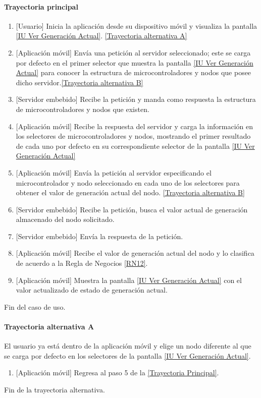\paragraph{Trayectoria principal}
    \label{SUB-U-CU1.1:TP}
	\begin{enumerate}
	    \item {[Usuario]} Inicia la aplicación desde su dispositivo móvil y visualiza la pantalla \hyperref[fig:monitoreoReal]{[IU Ver Generación Actual]}. \hyperref[SUB-U-CU1.1:TA]{[Trayectoria alternativa A]}
	    \item {[Aplicación móvil]} Envía una petición al servidor seleccionado; este se carga por defecto en el primer selector que muestra la pantalla \hyperref[fig:monitoreoReal]{[IU Ver Generación Actual]} para conocer la estructura de microcontroladores y nodos que posee dicho servidor.\hyperref[SUB-U-CU1.1:TB]{[Trayectoria alternativa B]}
	    \item {[Servidor embebido]} Recibe la petición y manda como respuesta la estructura de microcontroladores y nodos que existen.
	    \item {[Aplicación móvil]} Recibe la respuesta del servidor y carga la información en los selectores de microcontroladores y nodos, mostrando el primer resultado de cada uno por defecto en su correspondiente selector de la pantalla \hyperref[fig:monitoreoReal]{[IU Ver Generación Actual]} 
	    \item {[Aplicación móvil]} Envía la petición al servidor especificando el microcontrolador y nodo seleccionado en cada uno de los selectores para obtener el valor de generación actual del nodo. \hyperref[SUB-U-CU1.1:TB]{[Trayectoria alternativa B]} 
	    \item {[Servidor embebido]} Recibe la petición, busca el valor actual de generación almacenado del nodo solicitado. 
	    \item {[Servidor embebido]} Envía la respuesta de la petición.
	    \item {[Aplicación móvil]} Recibe el valor de generación actual del nodo y lo clasifica de acuerdo a la Regla de Negocios \ref{RN12}. 
	    \item {[Aplicación móvil]} Muestra la pantalla \hyperref[fig:monitoreoReal]{[IU Ver Generación Actual]} con el valor actualizado de estado de generación actual.
	\end{enumerate}
	Fin del caso de uso.

\paragraph{Trayectoria alternativa A} \label{SUB-U-CU1.1:TA}
	El usuario ya está dentro de la aplicación móvil y elige un nodo diferente al que se carga por defecto en los selectores de la pantalla \hyperref[fig:monitoreoReal]{[IU Ver Generación Actual]}.
	\begin{enumerate}[label=A\arabic*.]
		\item {[Aplicación móvil]} Regresa al paso 5 de la \hyperref[SUB-U-CU1.1:TP]{[Trayectoria Principal]}.
	\end{enumerate}
	Fin de la trayectoria alternativa.

